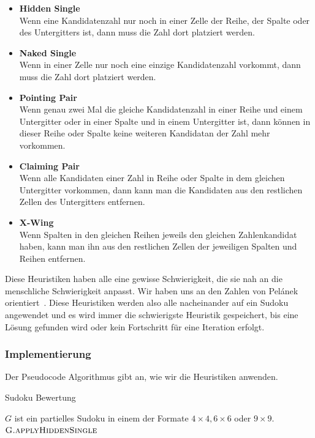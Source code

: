 \begin{itemize}
    \item \textbf{Hidden Single} \\
    Wenn eine Kandidatenzahl nur noch in einer Zelle der Reihe, der Spalte oder des Untergitters ist, dann muss die Zahl dort platziert werden.
    
    \item \textbf{Naked Single} \\
    Wenn in einer Zelle nur noch eine einzige Kandidatenzahl vorkommt, dann muss die Zahl dort platziert werden.

    \item \textbf{Pointing Pair} \\
    Wenn genau zwei Mal die gleiche Kandidatenzahl in einer Reihe und einem Untergitter oder in einer Spalte und in einem Untergitter ist, 
dann können in dieser Reihe oder Spalte keine weiteren Kandidatan der Zahl mehr vorkommen.

    \item \textbf{Claiming Pair} \\
    Wenn alle Kandidaten einer Zahl in Reihe oder Spalte in dem gleichen Untergitter vorkommen, dann kann man die Kandidaten aus den restlichen Zellen des Untergitters entfernen.

    \item \textbf{X-Wing} \\
    Wenn Spalten in den gleichen Reihen jeweils den gleichen Zahlenkandidat haben, kann man ihn aus den restlichen Zellen der jeweiligen Spalten und Reihen entfernen.
\end{itemize}

Diese Heuristiken haben alle eine gewisse Schwierigkeit, die sie nah an die menschliche Schwierigkeit anpasst. 
Wir haben uns an den Zahlen von Pel{\'{a}}nek orientiert~\cite{Pelanek14}.
Diese Heuristiken werden also alle nacheinander auf ein Sudoku angewendet und es wird immer die schwierigste Heuristik gespeichert, 
bis eine Lösung gefunden wird oder kein Fortschritt für eine Iteration erfolgt.

\subsubsection{Implementierung}
Der Pseudocode Algorithmus gibt an, wie wir die Heuristiken anwenden.

\begin{algorithm}
    \caption{Sudoku Bewertung}
    \label{alg:schwierigkeit}
    \begin{algorithmic}[1]
        \Require $G$ ist ein partielles Sudoku in einem der Formate $4 \times 4, 6 \times 6$ oder $9\times 9$.
            \For{}
                \State $\Call{G.applyHiddenSingle}{}$
            \EndFor
        \EndFunction
    \end{algorithmic}
\end{algorithm}

